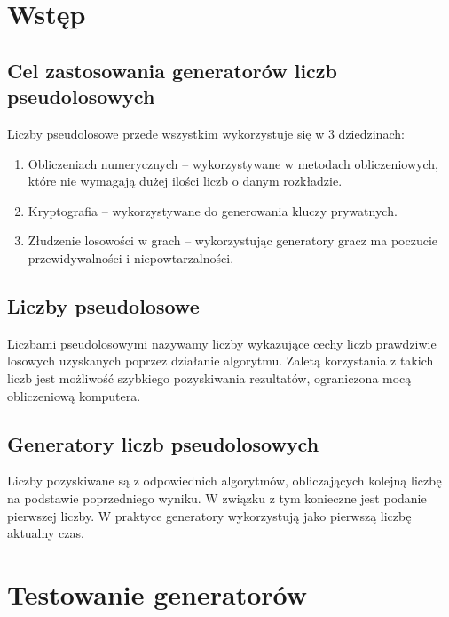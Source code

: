 \documentclass[11pt]{aghdpl}
\author{Żaneta Błaszczuk, Rafał Kozik, Filip Kubicz, Jakub Nowak, Jakub Porębski}
\date{2014}
\begin{document}
\titlepages
\section{Wstęp}
\subsection{Cel zastosowania generatorów liczb pseudolosowych}
Liczby pseudolosowe przede wszystkim wykorzystuje się w 3 dziedzinach:
\begin{enumerate}
\item Obliczeniach numerycznych – wykorzystywane w metodach obliczeniowych, które nie wymagają dużej ilości liczb o danym rozkładzie.
\item Kryptografia – wykorzystywane do generowania kluczy prywatnych.
\item Złudzenie losowości w grach – wykorzystując generatory gracz ma poczucie przewidywalności i niepowtarzalności.  
\end{enumerate}
\subsection{Liczby pseudolosowe}
Liczbami pseudolosowymi nazywamy liczby wykazujące cechy liczb prawdziwie losowych uzyskanych poprzez działanie algorytmu. Zaletą korzystania z takich liczb jest możliwość szybkiego pozyskiwania rezultatów, ograniczona mocą obliczeniową komputera.\\

\subsection{Generatory liczb pseudolosowych}
Liczby pozyskiwane są z odpowiednich algorytmów, obliczających kolejną liczbę na podstawie poprzedniego wyniku. W związku z tym konieczne jest podanie pierwszej liczby. W praktyce generatory wykorzystują jako pierwszą liczbę aktualny czas. 
\section{Testowanie generatorów}
\end{document}
